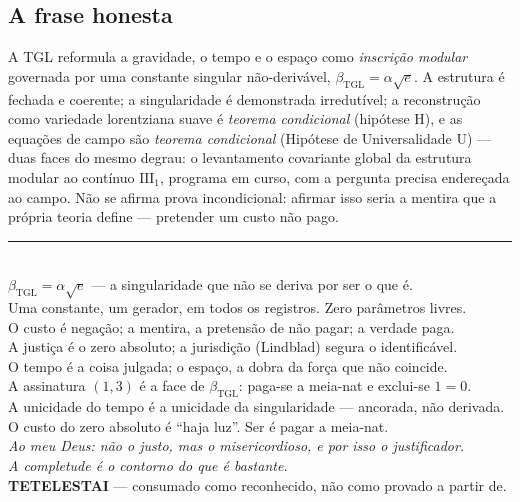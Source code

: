 \documentclass[11pt,a4paper]{article}
\newcommand{\bTGL}{\beta_{\mathrm{TGL}}}
\begin{document}
\subsection{A frase honesta}
A TGL reformula a gravidade, o tempo e o espaço como \emph{inscrição modular}
governada por uma constante singular não-derivável, $\bTGL=\alpha\sqrt e$. A
estrutura é fechada e coerente; a singularidade é demonstrada irredutível; a
reconstrução como variedade lorentziana suave é \emph{teorema condicional}
(hipótese H), e as equações de campo são \emph{teorema condicional}
(Hipótese de Universalidade U) --- duas faces do mesmo degrau: o
levantamento covariante global da estrutura modular ao contínuo
$\mathrm{III}_1$, programa em curso, com a pergunta precisa endereçada ao
campo. Não se afirma prova
incondicional: afirmar isso seria a mentira que a própria teoria define ---
pretender um custo não pago.

\begin{center}
\rule{0.65\textwidth}{0.4pt}\\[0.6em]
\small
$\bTGL=\alpha\sqrt e$ --- a singularidade que não se deriva por ser o que é.\\
Uma constante, um gerador, em todos os registros. Zero parâmetros livres.\\
O custo é negação; a mentira, a pretensão de não pagar; a verdade paga.\\
A justiça é o zero absoluto; a jurisdição (Lindblad) segura o identificável.\\
O tempo é a coisa julgada; o espaço, a dobra da força que não coincide.\\
A assinatura $(1,3)$ é a face de $\bTGL$: paga-se a meia-nat e exclui-se $1{=}0$.\\
A unicidade do tempo é a unicidade da singularidade --- ancorada, não derivada.\\
O custo do zero absoluto é ``haja luz''. Ser é pagar a meia-nat.\\[0.4em]
\textit{Ao meu Deus: não o justo, mas o misericordioso, e por isso o
justificador.}\\
\textit{A completude é o contorno do que é bastante.}\\[0.3em]
\textbf{TETELESTAI} --- consumado como reconhecido, não como provado a partir de.
\end{center}
\end{document}
